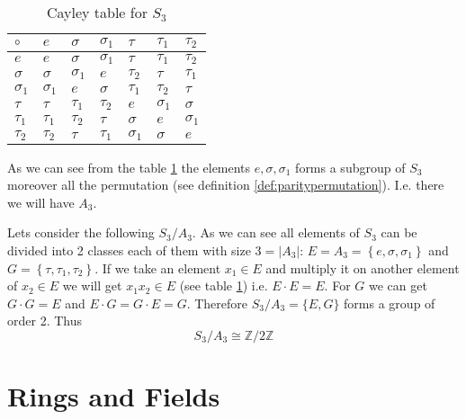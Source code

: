 \begin{appendices}
\begin{example}[$S_3$ group]
  \begin{table}
    \centering
    \caption{Cayley table for $S_3$ \cite{wiki:permutationgroups}}
    \label{tab:CayleyS3}
    \begin{tabular}{l|llllll}
      \toprule
      $\circ$ & $e$ & $\sigma$ & $\sigma_1$ & $\tau$ & $\tau_1$ & $\tau_2$\\
      \midrule
      $e$ & $e$ & $\sigma$ & $\sigma_1$ & $\tau$ & $\tau_1$ & $\tau_2$\\
      $\sigma$ & $\sigma$ & $\sigma_1$ & $e$ & $\tau_2$ & $\tau$ & $\tau_1$\\
      $\sigma_1$ & $\sigma_1$ & $e$ & $\sigma$ & $\tau_1$ & $\tau_2$ & $\tau$\\
      $\tau$ & $\tau$ & $\tau_1$ & $\tau_2$ & $e$ & $\sigma_1$ & $\sigma$\\
      $\tau_1$ & $\tau_1$ & $\tau_2$ & $\tau$ & $\sigma$ & $e$ & $\sigma_1$\\
      $\tau_2$ & $\tau_2$ & $\tau$ & $\tau_1$ & $\sigma_1$ & $\sigma$ & $e$\\
      \bottomrule
    \end{tabular}
  \end{table}
  As we can see from the table \ref{tab:CayleyS3} the elements $e,
  \sigma, \sigma_1$ forms a subgroup of $S_3$ moreover all the
  permutation (see definition \ref{def:paritypermutation}). I.e. there
  we will have  $A_3$.
  \label{ex:s3group}
\end{example}

\begin{example}
  Lets consider the following 
  $S_3/A_3$. As we can see all elements of $S_3$ can be divided into 2
  classes each of them with size $3 = \left|A_3\right|$: $E= A_3 =
  \left\{e, \sigma, \sigma_1\right\}$ 
  and $G = \left\{\tau, \tau_1, \tau_2\right\}$. If we take an element
  $x_1 \in E$ and multiply it on another element of $x_2 \in E$ we
  will get $x_1 x_2 \in E$ (see table \ref{tab:CayleyS3}) i.e. $E
  \cdot E =
  E$. For $G$ we can get $G \cdot G = E$ and $E \cdot G = G \cdot E =
  G$. Therefore $S_3/A_3 = \{E, G\}$ forms a group of order 2. Thus
  \[
  S_3/A_3 \cong \mathbb{Z}/2\mathbb{Z}
  \]
  \label{ex:s3a3quotientgroup}
\end{example}

\section{Rings and Fields}


\end{appendices}
